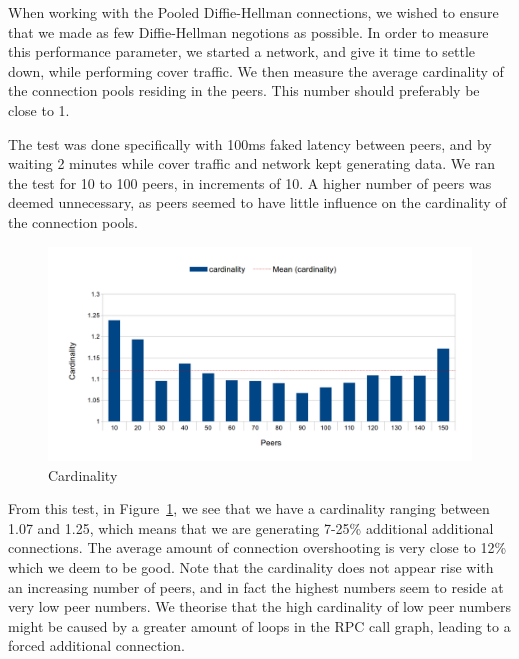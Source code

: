 When working with the Pooled Diffie-Hellman connections, we wished to ensure that we made as few Diffie-Hellman negotions as possible. In order to measure this performance parameter, we started a network, and give it time to settle down, while performing cover traffic. We then measure the average cardinality of the connection pools residing in the peers. This number should preferably be close to 1.

The test was done specifically with 100ms faked latency between peers, and by waiting 2 minutes while cover traffic and network kept generating data. We ran the test for 10 to 100 peers, in increments of 10. A higher number of peers was deemed unnecessary, as peers seemed to have little influence on the cardinality of the connection pools.

\begin{figure}
\caption{Cardinality}
\label{graph_cardinality}
\includegraphics[width=\textwidth]{../Grapes/DH_pools_cardinality_graph.png}
\end{figure}

From this test, in Figure~\ref{graph_cardinality}, we see that we have a cardinality ranging between 1.07 and 1.25, which means that we are generating 7-25\% additional additional connections. The average amount of connection overshooting is very close to 12\% which we deem to be good. Note that the cardinality does not appear rise with an increasing number of peers, and in fact the highest numbers seem to reside at very low peer numbers. We theorise that the high cardinality of low peer numbers might be caused by a greater amount of loops in the RPC call graph, leading to a forced additional connection.